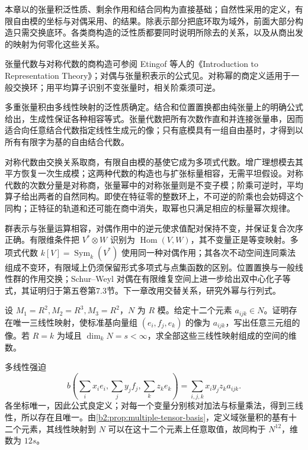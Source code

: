 \ProseParagraphBreak

本章以的张量积泛性质、剩余作用和结合同构为直接基础；自然性采用的定义，有限自由模的坐标与对偶采用、的结果。除表示部分把底环取为域外，前面大部分构造只需交换底环。各类商构造的泛性质都要同时说明所除去的关系，以及从商出发的映射为何零化这些关系。

\ProseParagraphBreak
张量代数与对称代数的商构造可参阅 Etingof 等人的《Introduction to Representation Theory》\cite[Section 2.12, Definition 2.12.1, p. 35]{EtingofEtAl2011RepresentationTheory}；对偶与张量积表示的公式见\cite[Section 4.4, p. 65]{EtingofEtAl2011RepresentationTheory}。对称幂的商定义适用于一般交换环；用平均算子识别不变张量时，相关阶乘须可逆。






\begin{chaptersummary}
	多重张量积由多线性映射的泛性质确定。结合和位置置换都由纯张量上的明确公式给出，生成性保证各种相容等式。张量代数把所有次数作直和并连接张量串，因而适合向任意结合代数指定线性生成元的像；只有底模具有一组自由基时，才得到以所有有限字为基的自由结合代数。

	\ProseParagraphBreak
	对称代数由交换关系取商，有限自由模的基使它成为多项式代数。增广理想模去其平方恢复一次生成模；这两种代数的构造也与扩张标量相容，无需平坦假设。对称代数的次数分量是对称商，张量幂中的对称张量则是不变子模；阶乘可逆时，平均算子给出两者的自然同构。即使在特征零的整数环上，不可逆的阶乘也会妨碍这个同构；正特征的轨道和还可能在商中消失，取幂也只满足相应的标量幂次规律。

	\ProseParagraphBreak
	群表示与张量运算相容，对偶作用中的逆元使求值配对保持不变，并保证复合次序正确。有限维条件把 \(V^*\otimes W\) 识别为 \(\operatorname{Hom}(V,W)\)，其不变量正是等变映射。多项式代数 \(k[V]=\operatorname{Sym}_k(V^*)\) 使用同一种对偶作用；其各次不动空间连同乘法组成不变环，有限域上仍须保留形式多项式与点集函数的区别。位置置换与一般线性群的作用交换；Schur–Weyl 对偶在有限维复空间上进一步给出双中心化子等式，其证明归于第五卷第7.3节。下一章改用交替关系，研究外幂与行列式。
\end{chaptersummary}

\BookExercises

\begin{exercise}\label{b2:ex:08-trilinear-coordinates}
	设 \(M_1=R^2,M_2=R^3,M_3=R^2\)，\(N\) 为 \(R\) 模。给定十二个元素 \(a_{ijk}\in N\)。证明存在唯一三线性映射，使标准基向量组 \((e_i,f_j,e_k)\) 的像为 \(a_{ijk}\)，写出任意三元组的像。若 \(R=k\) 为域且 \(\dim_kN=s<\infty\)，求全部这些三线性映射组成的空间的维数。
\end{exercise}
\begin{solution}
	多线性强迫
	\[
		b\left(\sum_i x_i e_i,\sum_j y_jf_j,\sum_k z_ke_k\right) =\sum_{i,j,k}x_iy_jz_k a_{ijk}.
	\]
	各坐标唯一，因此公式良定义；对每一个变量分别核对加法与标量乘法，得到三线性，所以存在且唯一。由\cref{b2:prop:multiple-tensor-basis}，定义域张量积的基有十二个元素，其线性映射到 \(N\) 可以在这十二个元素上任意取值，故同构于 \(N^{12}\)，维数为 \(12s\)。
\end{solution}


